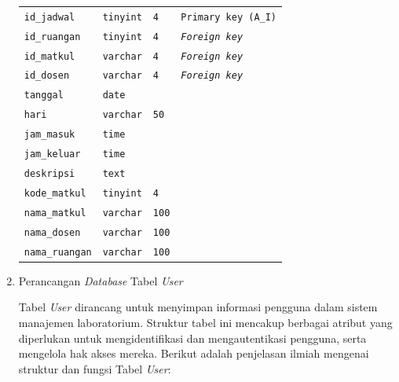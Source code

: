\begin{enumerate}
{\begin{longtable}{p{3 cm} p{3cm} p{3 cm} p{3.4 cm}}
				      \texttt{id\_jadwal}     & \texttt{tinyint}       & \texttt{4}               & \texttt{Primary key (A\_I)}   \\
				      \texttt{id\_ruangan}    & \texttt{tinyint}       & \texttt{4}               & \textit{\texttt{Foreign key}} \\
				      \texttt{id\_matkul}     & \texttt{varchar}       & \texttt{4}               & \textit{\texttt{Foreign key}} \\
				      \texttt{id\_dosen}      & \texttt{varchar}       & \texttt{4}               & \textit{\texttt{Foreign key}} \\
				      \texttt{tanggal}        & \texttt{date}          &                          &                               \\
				      \texttt{hari}           & \texttt{varchar}       & \texttt{50}              &                               \\
				      \texttt{jam\_masuk}     & \texttt{time}          &                          &                               \\
				      \texttt{jam\_keluar}    & \texttt{time}          &                          &                               \\
				      \texttt{deskripsi}      & \texttt{text}          &                          &                               \\
				      \texttt{kode\_matkul}   & \texttt{tinyint}       & \texttt{4}               &                               \\
				      \texttt{nama\_matkul}   & \texttt{varchar}       & \texttt{100}             &                               \\
				      \texttt{nama\_dosen}    & \texttt{varchar}       & \texttt{100}             &                               \\
				      \texttt{nama\_ruangan}  & \texttt{varchar}       & \texttt{100}             &                               \\
				      \hline
			      \end{longtable}
		      }

	\item Perancangan \textit{Database} Tabel \textit{User}

	      Tabel \textit{User} dirancang untuk menyimpan informasi pengguna dalam sistem manajemen laboratorium. Struktur tabel ini mencakup berbagai atribut yang diperlukan untuk mengidentifikasi dan mengautentikasi pengguna, serta mengelola hak akses mereka. Berikut adalah penjelasan ilmiah mengenai struktur dan fungsi Tabel \textit{User}:


\end{enumerate}

